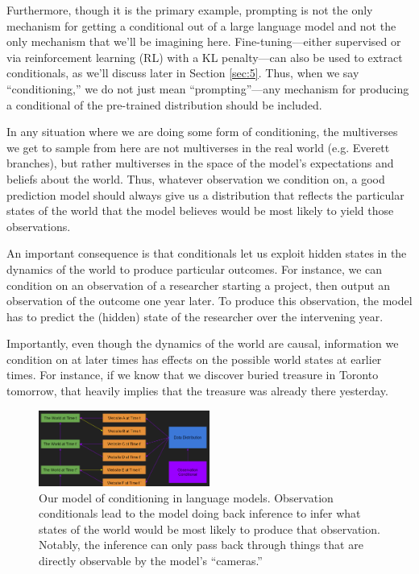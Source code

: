 \documentclass[
  twocolumn,
  natbib,
]{miri-tech-article}
\begin{document}
Furthermore, though it is the primary example, prompting is not the only mechanism for getting a conditional out of a large language model and not the only mechanism that we'll be imagining here. Fine-tuning---either supervised or via reinforcement learning (RL) with a KL penalty\cite{kl_penalty}---can also be used to extract conditionals, as we'll discuss later in Section \ref{sec:5}. Thus, when we say ``conditioning,'' we do not just mean ``prompting''---any mechanism for producing a conditional of the pre-trained distribution should be included.

In any situation where we are doing some form of conditioning, the multiverses we get to sample from here are not multiverses in the real world (e.g. Everett branches\cite{multiple_worlds}), but rather multiverses in the space of the model's expectations and beliefs about the world. Thus, whatever observation we condition on, a good prediction model should always give us a distribution that reflects the particular states of the world that the model believes would be most likely to yield those observations.

An important consequence is that conditionals let us exploit hidden states in the dynamics of the world to produce particular outcomes. For instance, we can condition on an observation of a researcher starting a project, then output an observation of the outcome one year later. To produce this observation, the model has to predict the (hidden) state of the researcher over the intervening year.

Importantly, even though the dynamics of the world are causal, information we condition on at later times has effects on the possible world states at earlier times. For instance, if we know that we discover buried treasure in Toronto tomorrow, that heavily implies that the treasure was already there yesterday.

\begin{figure}[h!]
  \centering
  \includegraphics[width=0.5\textwidth]{FHhZzMg.png}
  \caption{Our model of conditioning in language models. Observation conditionals lead to the model doing back inference to infer what states of the world would be most likely to produce that observation. Notably, the inference can only pass back through things that are directly observable by the model's ``cameras.''}
\end{figure}
\end{document}
